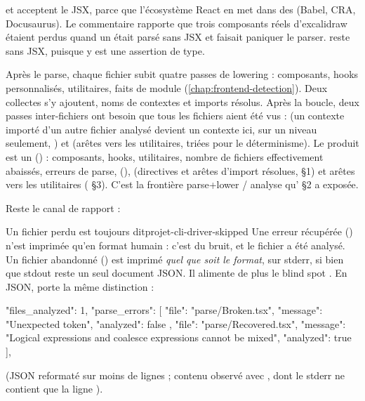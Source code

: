 
 et  acceptent le JSX, parce que l'écosystème React en met dans des  (Babel, CRA, Docusaurus). Le commentaire rapporte que trois composants réels d'excalidraw étaient perdus quand un  était parsé sans JSX et faisait paniquer le parser.  reste sans JSX, puisque  y est une assertion de type.

Après le parse, chaque fichier subit quatre passes de lowering : composants, hooks personnalisés, utilitaires, faits de module (\cref{chap:frontend-detection}). Deux collectes s'y ajoutent, noms de contextes et imports résolus. Après la boucle, deux passes inter-fichiers ont besoin que tous les fichiers aient été vus :  (un contexte importé d'un autre fichier analysé devient un contexte ici, sur un niveau seulement, ) et  (arêtes vers les utilitaires, triées pour le déterminisme). Le produit est un  () : composants, hooks, utilitaires, nombre de fichiers effectivement abaissés, erreurs de parse,  (),  (directives et arêtes d'import résolues,  §1) et arêtes vers les utilitaires ( §3). C'est la frontière \og parse+lower / analyse\fg{} qu' §2 a exposée.

Reste le canal de rapport :


\begin{invariant}{Un fichier perdu est toujours dit}{projet-cli-driver-skipped}
Une erreur récupérée () n'est imprimée qu'en format humain : c'est du bruit, et le fichier a été analysé. Un fichier abandonné (\code{[skipped]}) est imprimé \emph{quel que soit le format}, sur stderr, si bien que stdout reste un seul document JSON. Il alimente de plus le blind spot . En JSON,  porte la même distinction :
\begin{sortie}
  "files_analyzed": 1,
  "parse_errors": [
    { "file": "parse/Broken.tsx", "message": "Unexpected token", "analyzed": false },
    { "file": "parse/Recovered.tsx", "message": "Logical expressions and coalesce expressions cannot be mixed", "analyzed": true }
  ],
\end{sortie}
\noindent(JSON reformaté sur moins de lignes ; contenu observé avec , dont le stderr ne contient que la ligne \code{[skipped]}).
\end{invariant}

